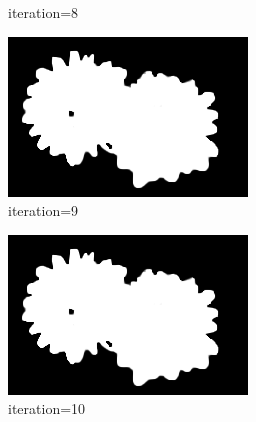 \documentclass{article}
\begin{document}
\begin{figure}[t]
\begin{subfigure}[t]{0.19\textwidth}
\vspace{-0.6cm}
\caption{iteration=8}
\end{subfigure}
\begin{subfigure}[t]{0.19\textwidth}
\centering
\includegraphics[width=\textwidth]{./images/marginals_iter_9.png}
\vspace{-0.6cm}
\caption{iteration=9}
\end{subfigure}
\begin{subfigure}[t]{0.19\textwidth}
\centering
\includegraphics[width=\textwidth]{./images/marginals_iter_10.png}
\vspace{-0.6cm}
\caption{iteration=10}
\end{subfigure}
\begin{subfigure}[t]{0.19\textwidth}
\centering

\end{subfigure}
\end{figure}
\end{document}
